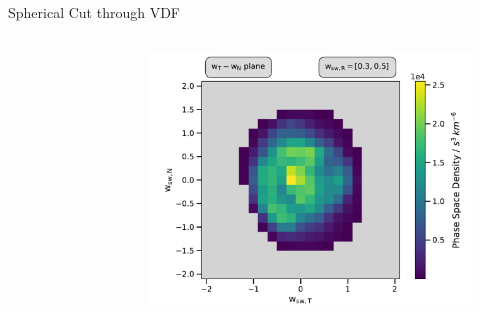 \documentclass{beamer}
\begin{document}
\begin{frame}{Spherical Cut through VDF}
\begin{columns}
\begin{figure}
	\end{figure}
	\column{6.5cm}
	\begin{figure}
	\includegraphics[scale=.45]{Pics/cart_50_ps_R.pdf}
	\end{figure}
\column{.5cm}
\end{columns}
\end{frame}
\end{document}

